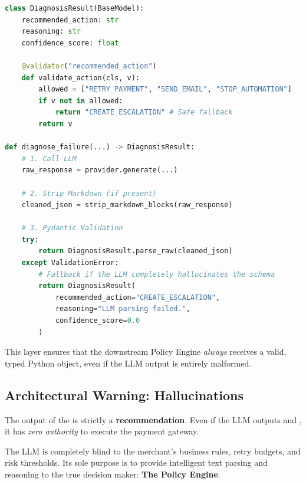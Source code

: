\begin{tcolorbox}[codebox={Parsing and Validation}]
\begin{lstlisting}[language=Python]
class DiagnosisResult(BaseModel):
    recommended_action: str
    reasoning: str
    confidence_score: float
    
    @validator("recommended_action")
    def validate_action(cls, v):
        allowed = ["RETRY_PAYMENT", "SEND_EMAIL", "STOP_AUTOMATION"]
        if v not in allowed:
            return "CREATE_ESCALATION" # Safe fallback
        return v

def diagnose_failure(...) -> DiagnosisResult:
    # 1. Call LLM
    raw_response = provider.generate(...)
    
    # 2. Strip Markdown (if present)
    cleaned_json = strip_markdown_blocks(raw_response)
    
    # 3. Pydantic Validation
    try:
        return DiagnosisResult.parse_raw(cleaned_json)
    except ValidationError:
        # Fallback if the LLM completely hallucinates the schema
        return DiagnosisResult(
            recommended_action="CREATE_ESCALATION",
            reasoning="LLM parsing failed.",
            confidence_score=0.0
        )
\end{lstlisting}
\end{tcolorbox}

This layer ensures that the downstream Policy Engine \textit{always} receives a valid, typed Python object, even if the LLM output is entirely malformed.

\vspace{0.8cm}

\subsection{Architectural Warning: Hallucinations}

\begin{tcolorbox}[warningbox={LLM Recommendations are NOT Commands}]
The output of the  is strictly a \textbf{recommendation}. Even if the LLM outputs  and , it has \textit{zero authority} to execute the payment gateway. 

The LLM is completely blind to the merchant's business rules, retry budgets, and risk thresholds. Its sole purpose is to provide intelligent text parsing and reasoning to the true decision maker: \textbf{The Policy Engine}.
\end{tcolorbox}
